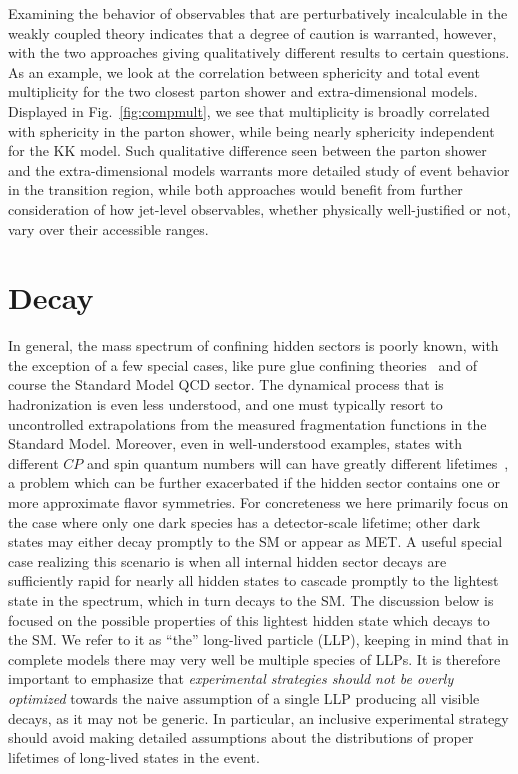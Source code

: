 Examining the behavior of observables that are perturbatively incalculable in the weakly coupled theory indicates that a degree of caution is warranted, however, with the two approaches giving qualitatively different results to certain questions. As an example, we look at the correlation between sphericity and total event multiplicity for the two closest parton shower and extra-dimensional models. Displayed in Fig.~\ref{fig:compmult}, we see that multiplicity is broadly correlated with sphericity in the parton shower, while being nearly sphericity independent for the KK model. Such qualitative difference seen between the parton shower and the extra-dimensional models warrants more detailed study of event behavior in the transition region, while both approaches would benefit from further consideration of how jet-level observables, whether physically well-justified or not, vary over their accessible ranges.

\section{Decay}
\label{sec:darkshowerdk}

In general, the mass spectrum of confining hidden sectors is poorly known, with the exception of a few special cases, like pure glue confining theories~\cite{Morningstar:1999rf} and of course the Standard Model QCD sector. The dynamical process that is hadronization is even less understood, and one must typically resort to uncontrolled extrapolations from the measured fragmentation functions in the Standard Model. Moreover, even in well-understood examples,  states with different $CP$ and spin  quantum numbers will can have greatly different lifetimes~\cite{Strassler:2006im,Juknevich:2009ji,Juknevich:2009gg}, a problem which can be further exacerbated if the hidden sector contains one or more approximate flavor symmetries. For concreteness we here primarily focus on the case where only one dark species has a detector-scale lifetime; other dark states may either  decay promptly to the SM or appear as MET.
A useful special case realizing this scenario is when all internal hidden sector decays are sufficiently rapid for nearly all hidden states to cascade promptly to the lightest state in the spectrum, which in turn decays to the SM. The discussion below is focused on the possible properties of this lightest hidden state which decays to the SM. We refer to it as ``the'' long-lived particle (LLP), keeping in mind that in complete models there may very well be multiple species of LLPs. It is therefore important to emphasize that \emph{experimental strategies should not be overly optimized} towards the naive assumption of a single LLP producing all visible decays, as it may not be generic. In particular, an inclusive experimental strategy should avoid making detailed assumptions about the distributions of proper lifetimes of long-lived states in the event.  


